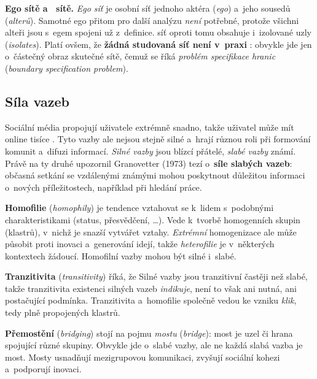 \documentclass[11pt,a4paper]{article}
\theoremstyle{definition}
\begin{document}
\textbf{Ego sítě a~ sítě.} \emph{Ego síť} je osobní síť jednoho aktéra
(\emph{ego}) a~jeho sousedů (\emph{alterů}). Samotné ego přitom pro další analýzu
\emph{není} potřebné, protože všichni alteři jsou s~egem spojeni už z~definice. 
síť oproti tomu obsahuje i~izolované uzly (\emph{isolates}). Platí ovšem, že \textbf{žádná
studovaná síť není v~praxi }: obvykle jde jen o~částečný obraz skutečné sítě, čemuž
se říká \emph{problém specifikace hranic} (\emph{boundary specification problem}).

\subsection{Síla vazeb}

Sociální média propojují uživatele extrémně snadno, takže uživatel může mít online tisíce
. Tyto vazby ale nejsou stejně silné a~hrají různou roli při formování komunit
a~difuzi informací. \emph{Silné vazby} jsou blízcí přátelé, \emph{slabé vazby} známí. Právě
na ty druhé upozornil Granovetter (1973) tezí o~\textbf{síle slabých vazeb}: občasná setkání
se vzdálenými známými mohou poskytnout důležitou informaci o~nových příležitostech,
například při hledání práce.

\begin{defbox}
\textbf{Homofilie} (\emph{homophily}) je tendence vztahovat se k~lidem s~podobnými
charakteristikami (status, přesvědčení, \dots). Vede k~tvorbě homogenních skupin (klastrů),
v~nichž je snazší vytvářet vztahy. \emph{Extrémní} homogenizace ale může působit proti
inovaci a~generování idejí, takže \emph{heterofilie} je v~některých kontextech žádoucí.
Homofilní vazby mohou být silné i~slabé.

\textbf{Tranzitivita} (\emph{transitivity}) říká, že  Silné vazby jsou tranzitivní
častěji než slabé, takže tranzitivita existenci silných vazeb \emph{indikuje}, není to však
ani nutná, ani postačující podmínka. Tranzitivita a~homofilie společně vedou ke vzniku
\emph{klik}, tedy plně propojených klastrů.

\textbf{Přemostění} (\emph{bridging}) stojí na pojmu \emph{mostu} (\emph{bridge}): most je
uzel či hrana spojující různé skupiny. Obvykle jde o~slabé vazby, ale ne každá slabá vazba je
most. Mosty usnadňují mezigrupovou komunikaci, zvyšují sociální kohezi a~podporují inovaci.
\end{defbox}
\end{document}
